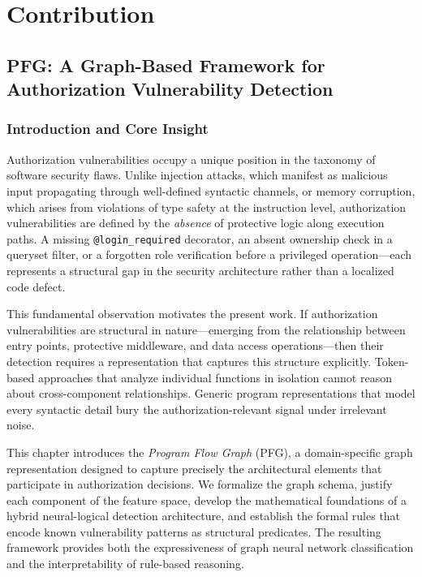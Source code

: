 
\part{Contribution}


\chapter{PFG: A Graph-Based Framework for Authorization Vulnerability Detection}
\label{ch:theory}

\section{Introduction and Core Insight}
\label{sec:ch3-intro}

Authorization vulnerabilities occupy a unique position in the taxonomy of software security flaws. Unlike injection attacks, which manifest as malicious input propagating through well-defined syntactic channels, or memory corruption, which arises from violations of type safety at the instruction level, authorization vulnerabilities are defined by the \emph{absence} of protective logic along execution paths. A missing \texttt{@login\_required} decorator, an absent ownership check in a queryset filter, or a forgotten role verification before a privileged operation—each represents a structural gap in the security architecture rather than a localized code defect.

This fundamental observation motivates the present work. If authorization vulnerabilities are structural in nature—emerging from the relationship between entry points, protective middleware, and data access operations—then their detection requires a representation that captures this structure explicitly. Token-based approaches that analyze individual functions in isolation cannot reason about cross-component relationships. Generic program representations that model every syntactic detail bury the authorization-relevant signal under irrelevant noise.

This chapter introduces the \emph{Program Flow Graph} (PFG), a domain-specific graph representation designed to capture precisely the architectural elements that participate in authorization decisions. We formalize the graph schema, justify each component of the feature space, develop the mathematical foundations of a hybrid neural-logical detection architecture, and establish the formal rules that encode known vulnerability patterns as structural predicates. The resulting framework provides both the expressiveness of graph neural network classification and the interpretability of rule-based reasoning.

